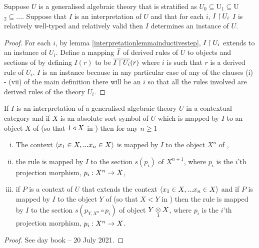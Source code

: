 \begin{lemma}
Suppose $U$ is a  generalised algebraic theory that is stratified as  $U_0 \subseteq $U$_1 \subseteq $U$_2 \subseteq ...$. 
 Suppose that $I$ is an interpretation of $U$  and that  for each $i$, $I \restrict U_i$  
$I$ is relatively well-typed and relatively valid then $I$ determines an instance of $U$.
\end{lemma}
\begin{proof}
For each $i$, by lemma \ref{interpretationlemmainductivestep}, $I \restrict U_i$ extends to an instance of $U_i$. Define a mapping
$\Ibar$ of derived rules of $U$ to objects and sections of \catcw by defining $I(r)$ to be $\overline{I \restrict U_i}(r)$ where
$i$ is such that $r$ is a derived rule of $U_i$. $I$ is an instance because in any particular case of any of the clauses (i) - (vii) of the main definition 
there will be an $i$ so that all the rules involved are derived rules of the theory $U_i$. 



\end{proof}


\begin{lemma}
If $I$ is an interpretation of a generalised algebraic theory $U$ in a contextual category \catcw and if $X$ is an absolute sort symbol of $U$ which is mapped 
by $I$ to an object $X$ of \catcw (so that $1 \base X$ in \catc) then for any $n \geq 1$ 
\begin{enumerate}[(i)]
\item
The context $\tuple{\ofT{x_1}{X},...\ofT{x_n}{X}}$ is mapped by $I$ to the object $X^n$ of \catc,
\item the rule 
 is mapped by $I$ to the section $s(p_i)$ of $X^{n+1}$, where $p_i$ is the $i$'th projection morphism, $p_i: X^n \morph X$,
\item if $P$ is a context of $U$ that extends the context $\tuple{\ofT{x_1}{X},...\ofT{x_n}{X}}$ and if $P$ is mapped by $I$ to
the object $Y$ of \catcw (so that $X < Y$ in \catc) then the rule 
 is mapped by $I$ to the section $s(p_{Y,X^n}\circ p_i)$ of object $\crossx{Y}{X}{1}$, where $p_i$ is the $i$'th projection morphism, $p_i: X^n \morph X$.
\end{enumerate}
\end{lemma}
\begin{proof}
See day book -- 20 July 2021.
\end{proof}

